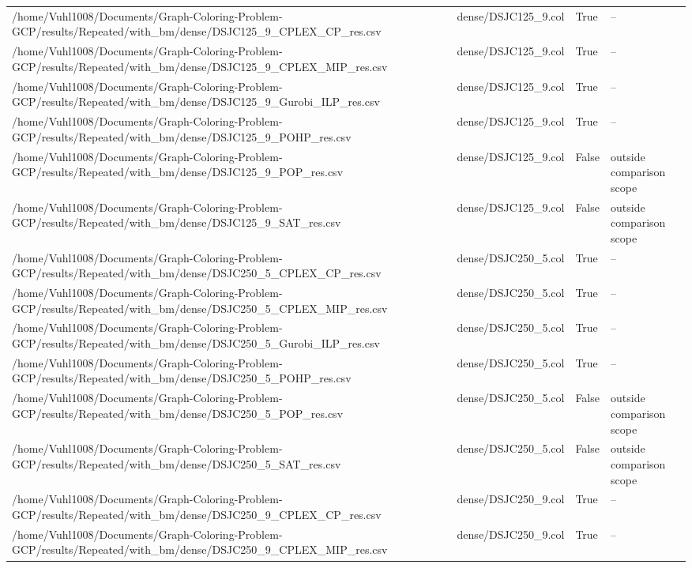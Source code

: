 \begin{table}[htbp]
\begin{tabular}{llll}
/home/Vuhl1008/Documents/Graph-Coloring-Problem-GCP/results/Repeated/with\_bm/dense/DSJC125\_9\_CPLEX\_CP\_res.csv & dense/DSJC125\_9.col & True & -- \\
/home/Vuhl1008/Documents/Graph-Coloring-Problem-GCP/results/Repeated/with\_bm/dense/DSJC125\_9\_CPLEX\_MIP\_res.csv & dense/DSJC125\_9.col & True & -- \\
/home/Vuhl1008/Documents/Graph-Coloring-Problem-GCP/results/Repeated/with\_bm/dense/DSJC125\_9\_Gurobi\_ILP\_res.csv & dense/DSJC125\_9.col & True & -- \\
/home/Vuhl1008/Documents/Graph-Coloring-Problem-GCP/results/Repeated/with\_bm/dense/DSJC125\_9\_POHP\_res.csv & dense/DSJC125\_9.col & True & -- \\
/home/Vuhl1008/Documents/Graph-Coloring-Problem-GCP/results/Repeated/with\_bm/dense/DSJC125\_9\_POP\_res.csv & dense/DSJC125\_9.col & False & outside comparison scope \\
/home/Vuhl1008/Documents/Graph-Coloring-Problem-GCP/results/Repeated/with\_bm/dense/DSJC125\_9\_SAT\_res.csv & dense/DSJC125\_9.col & False & outside comparison scope \\
/home/Vuhl1008/Documents/Graph-Coloring-Problem-GCP/results/Repeated/with\_bm/dense/DSJC250\_5\_CPLEX\_CP\_res.csv & dense/DSJC250\_5.col & True & -- \\
/home/Vuhl1008/Documents/Graph-Coloring-Problem-GCP/results/Repeated/with\_bm/dense/DSJC250\_5\_CPLEX\_MIP\_res.csv & dense/DSJC250\_5.col & True & -- \\
/home/Vuhl1008/Documents/Graph-Coloring-Problem-GCP/results/Repeated/with\_bm/dense/DSJC250\_5\_Gurobi\_ILP\_res.csv & dense/DSJC250\_5.col & True & -- \\
/home/Vuhl1008/Documents/Graph-Coloring-Problem-GCP/results/Repeated/with\_bm/dense/DSJC250\_5\_POHP\_res.csv & dense/DSJC250\_5.col & True & -- \\
/home/Vuhl1008/Documents/Graph-Coloring-Problem-GCP/results/Repeated/with\_bm/dense/DSJC250\_5\_POP\_res.csv & dense/DSJC250\_5.col & False & outside comparison scope \\
/home/Vuhl1008/Documents/Graph-Coloring-Problem-GCP/results/Repeated/with\_bm/dense/DSJC250\_5\_SAT\_res.csv & dense/DSJC250\_5.col & False & outside comparison scope \\
/home/Vuhl1008/Documents/Graph-Coloring-Problem-GCP/results/Repeated/with\_bm/dense/DSJC250\_9\_CPLEX\_CP\_res.csv & dense/DSJC250\_9.col & True & -- \\
/home/Vuhl1008/Documents/Graph-Coloring-Problem-GCP/results/Repeated/with\_bm/dense/DSJC250\_9\_CPLEX\_MIP\_res.csv & dense/DSJC250\_9.col & True & -- \\

\end{tabular}
\end{table}
